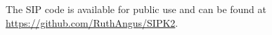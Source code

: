 The SIP code is available for public use and can be found at
\url{https://github.com/RuthAngus/SIPK2}.


% 
% 
% 
